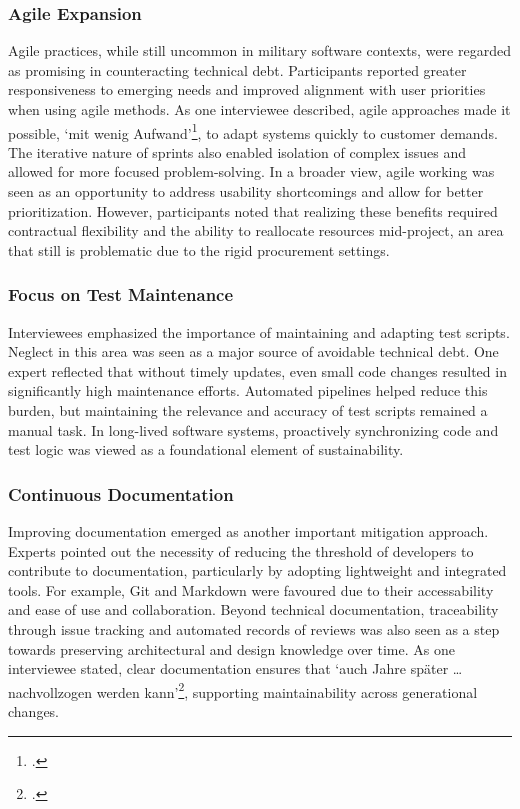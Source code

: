 \subsubsection{Agile Expansion}
Agile practices, while still uncommon in military software contexts, were regarded as promising in counteracting technical debt. Participants reported greater responsiveness to emerging needs and improved alignment with user priorities when using agile methods.
As one interviewee described, agile approaches made it possible, `mit wenig Aufwand'\footcite{Interview32025}, to adapt systems quickly to customer demands. The iterative nature of sprints also enabled isolation of complex issues and allowed for more focused problem-solving.
In a broader view, agile working was seen as an opportunity to address usability shortcomings and allow for better prioritization. However, participants noted that realizing these benefits required contractual flexibility and the ability to reallocate resources mid-project, an area that still is problematic due to the rigid procurement settings.

\subsubsection{Focus on Test Maintenance}
Interviewees emphasized the importance of maintaining and adapting test scripts. Neglect in this area was seen as a major source of avoidable technical debt. One expert reflected that without timely updates, even small code changes resulted in significantly high maintenance efforts.
Automated pipelines helped reduce this burden, but maintaining the relevance and accuracy of test scripts remained a manual task. In long-lived software systems, proactively synchronizing code and test logic was viewed as a foundational element of sustainability.

\subsubsection{Continuous Documentation}
Improving documentation emerged as another important mitigation approach. Experts pointed out the necessity of reducing the threshold of developers to contribute to documentation, particularly by adopting lightweight and integrated tools. For example, Git and Markdown were favoured due to their accessability and ease of use and collaboration.
Beyond technical documentation, traceability through issue tracking and automated records of reviews was also seen as a step towards preserving architectural and design knowledge over time. As one interviewee stated, clear documentation ensures that `auch Jahre später \ldots nachvollzogen werden kann'\footcite{Interview22025}, supporting maintainability across generational changes.

